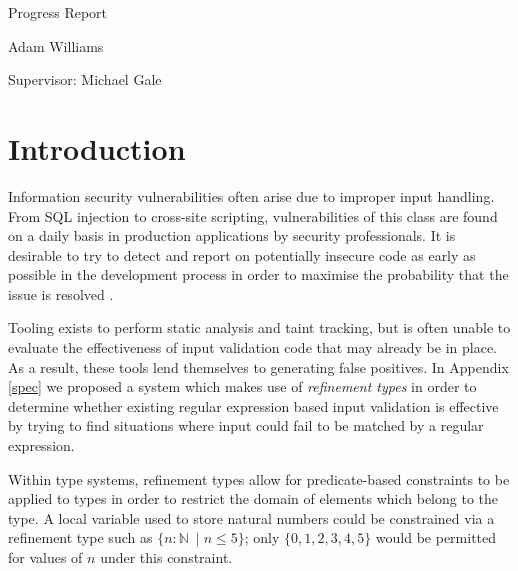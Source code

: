 \documentclass[a4paper]{article}
\begin{document}
\begin{titlepage}
    {\par}
    \vspace{1.25cm}
    \vspace{3.5cm}
    {\hspace{0.75cm}\Huge \sffamily Progress Report}
    \vspace{0.16cm}
    {\par}
    {\hspace{0.75cm}\large \sffamily Adam Williams}
    
    \vspace{0cm}
    {\par}
    {\hspace{0.75cm}\large \sffamily Supervisor: Michael Gale}
    \vfill
\end{titlepage}
\restoregeometry
\restorepagecolor
\tableofcontents
\pagebreak[5]
    
    \section{Introduction}
    
    Information security vulnerabilities often arise due to improper input handling. From SQL injection to cross-site scripting, vulnerabilities of this class are found on a daily basis in production applications by security professionals. It is desirable to try to detect and report on potentially insecure code as early as possible in the development process in order to maximise the probability that the issue is resolved \citep{Sadowski:2018:LBS:3200906.3188720}.
    
    Tooling exists to perform static analysis and taint tracking, but is often unable to evaluate the effectiveness of input validation code that may already be in place. As a result, these tools lend themselves to generating false positives. In Appendix \ref{spec} we proposed a system which makes use of \emph{refinement types} in order to determine whether existing regular expression based input validation is effective by trying to find situations where input could fail to be matched by a regular expression.
    
    Within type systems, refinement types allow for predicate-based constraints to be applied to types in order to restrict the domain of elements which belong to the type. A local variable used to store natural numbers could be constrained via a refinement type such as $\{n: \mathbb{N}\ \mid n \leq 5\}$;  only $\{0, 1, 2, 3, 4, 5\}$ would be permitted for values of $n$ under this constraint.
    
\end{document}
